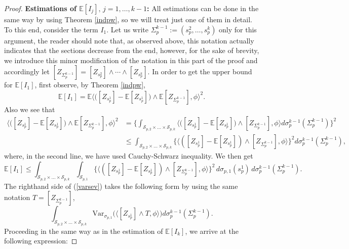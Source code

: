 \documentclass[11pt,leqno,oneside]{amsart}
\numberwithin{equation}{section}
\begin{document}
\begin{proof}
\medskip



\vspace{5mm}

\noindent\textbf{Estimations of $\mathbb{E}[I_j], \,j=1, \ldots, k-1$:} All estimations can be done in the same way by using Theorem \ref{indpw}, so we will treat just one of them in detail. To this end, consider the term $I_{1}$. Let us write $\Sigma^{k-1}_{p}:= (s^{2}_{p}, \ldots, s^{k}_{p})$ only for this argument, the reader should note that, as observed above, this notation actually indicates that the sections decrease from the end, however, for the sake of brevity, we introduce this minor modification of the notation in this part of the proof and accordingly let $[Z_{\Sigma^{k-1}_{p}}]=[Z_{s^{2}_{p}}] \wedge \cdots \wedge [Z_{s_{p}^{k}}]$. In order to get the upper bound for $\mathbb{E}[I_{1}]$, first observe, by Theorem \ref{indpw},  \begin{equation} \label{werr} \mathbb{E}[I_{1}]= \mathbb{E}\big\langle \big([Z_{s_{p}^{1}}]- \mathbb{E} [Z_{s_{p}^{1}}]\big) \wedge \mathbb{E}[Z_{\Sigma_{p}^{k-1}}], \phi  \big\rangle^{2}.\end{equation}Also we see that \begin{align*}\big\langle \big([Z_{s_{p}^{1}}]- \mathbb{E} [Z_{s_{p}^{1}}]\big) \wedge \mathbb{E}[Z_{\Sigma_{p}^{k-1}}], \phi  \big\rangle^{2} &=\Big\{\int_{\mathcal{S}_{p, 2} \times \ldots \times \mathcal{S}_{p, k}}{\big\langle\big([Z_{s_{p}^{1}}]- \mathbb{E}[Z_{s_{p}^{1}}]\big) \wedge [Z_{\Sigma_{p}^{k-1}}], \phi \big\rangle d\sigma_{p}^{k-1}(\Sigma_{p}^{k-1})} \Big\}^{2}  \\
& \leq \int_{\mathcal{S}_{p, 2} \times \ldots \times \mathcal{S}_{p, k}}{\Big\{\big\langle([Z_{s_{p}^{1}}]- \mathbb{E}[Z_{s_{p}^{1}}]) \wedge [Z_{\Sigma_{p}^{k-1}}], \phi \big\rangle \Big\}^{2} d\sigma^{k-1}_{p}(\Sigma_{p}^{k-1})}, \end{align*}where, in the second line, we have used Cauchy-Schwarz inequality. We then get \begin{equation}\label{varsev}
         \mathbb{E}[I_{1}]\leq \int_{\mathcal{S}_{p, 2} \times \ldots \times \mathcal{S}_{p, k}}\int_{\mathcal{S}_{p, 1}}\Big\{\big\langle([Z_{s_{p}^{1}}]- \mathbb{E}[Z_{s_{p}^{1}}]) \wedge [
         Z_{\Sigma_{p}^{k-1}}], \phi \big\rangle\Big\}^{2}\,  d\sigma_{p, 1}(s_{p}^{1})\, d\sigma^{k-1}_{p}(\Sigma_{p}^{k-1}). \end{equation} The righthand side of (\ref{varsev}) takes the following form by using the same notation $T= [Z_{\Sigma^{k-1}_{p}}]$, \begin{equation}\label{varsev2}
\int_{\mathcal{S}_{p, 2} \times \ldots \times \mathcal{S}_{p, k}}{\mathrm{Var}_{\sigma_{p, 1}} \big(\big\langle [Z_{s_{p}^{1}}] \wedge T, \phi \big\rangle \big) d\sigma_{p}^{k-1}(\Sigma_{p}^{k-1})}.\end{equation} Proceeding in the same way as in the estimation of $\mathbb{E}[I_k]$, we arrive at the following expression:


\end{proof}
\end{document}
